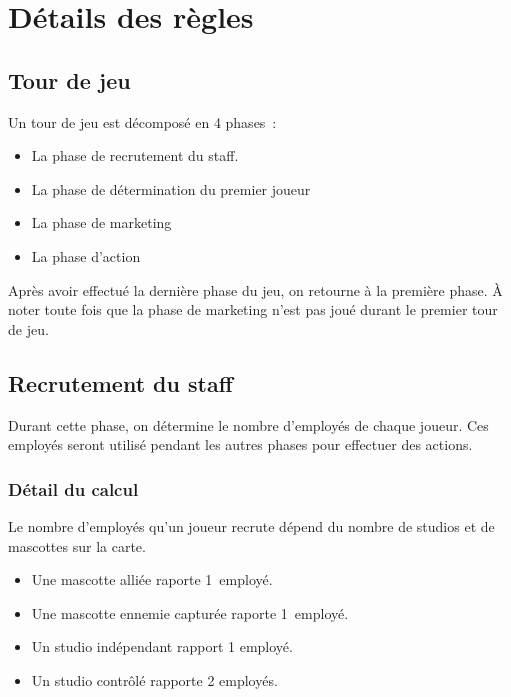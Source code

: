 \chapter{Détails des règles} \label{chapter:detail-regles}

        \section{Tour de jeu}

            Un tour de jeu est décomposé en 4 phases :

            \begin{itemize}
                \item La phase de recrutement du staff.
                \item La phase de détermination du premier joueur
                \item La phase de marketing
                \item La phase d'action
            \end{itemize}

            Après avoir effectué la dernière phase du jeu, on retourne à la première phase.
            À noter toute fois que la phase de marketing n'est pas joué durant le premier tour de jeu.

        \section{Recrutement du staff}
            Durant cette phase, on détermine le nombre d'employés de chaque joueur. Ces employés seront utilisé
            pendant les autres phases pour effectuer des actions.

            \subsection{Détail du calcul}
                Le nombre d'employés qu'un joueur recrute dépend du nombre de studios et de mascottes sur la carte.
                \begin{itemize}
                    \item Une mascotte alliée raporte 1 employé.
                    \item Une mascotte ennemie capturée raporte 1 employé.
                    \item Un studio indépendant rapport 1 employé.
                    \item Un studio contrôlé rapporte 2 employés.
                \end{itemize}

